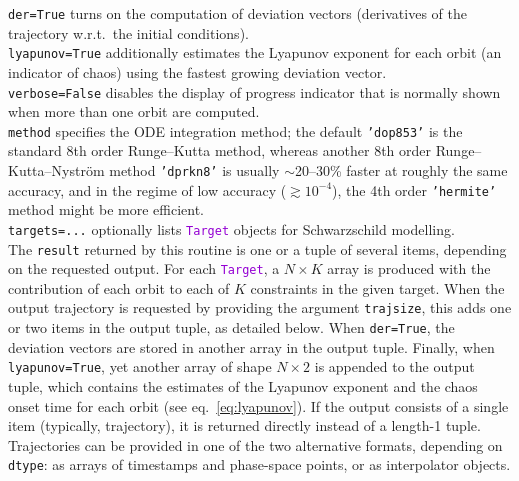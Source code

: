 \documentclass[12pt]{article}
\newcommand{\ttt}[1]{\textcolor{darkviolet}{\texttt{#1}}}
\newcommand{\ppp}[1]{\textcolor{darkolive} {\texttt{#1}}}
\begin{document}
\ppp{der}\texttt{=True} turns on the computation of deviation vectors (derivatives of the trajectory w.r.t.\ the initial conditions).\\
\ppp{lyapunov}\texttt{=True} additionally estimates the Lyapunov exponent for each orbit (an indicator of chaos) using the fastest growing deviation vector.\\
\ppp{verbose}\texttt{=False} disables the display of progress indicator that is normally shown when more than one orbit are computed.\\
\ppp{method} specifies the ODE integration method; the default \texttt{'dop853'} is the standard 8th order Runge--Kutta method, whereas another 8th order Runge--Kutta--Nystr\"om method \texttt{'dprkn8'} is usually $\sim$20--30\% faster at roughly the same accuracy, and in the regime of low accuracy ($\gtrsim 10^{-4}$), the 4th order \texttt{'hermite'} method might be more efficient.\\
\ppp{targets=...} optionally lists \ttt{Target} objects for Schwarzschild modelling. \\[2mm]
The \texttt{result} returned by this routine is one or a tuple of several items, depending on the requested output. For each \ttt{Target}, a $N\times K$ array is produced with the contribution of each orbit to each of $K$ constraints in the given target. When the output trajectory is requested by providing the argument \ppp{trajsize}, this adds one or two items in the output tuple, as detailed below. When \ppp{der}\texttt{=True}, the deviation vectors are stored in another array in the output tuple. Finally, when \ppp{lyapunov}\texttt{=True}, yet another array of shape $N\times 2$ is appended to the output tuple, which contains the estimates of the Lyapunov exponent and the chaos onset time for each orbit (see eq.~\ref{eq:lyapunov}). If the output consists of a single item (typically, trajectory), it is returned directly instead of a length-1 tuple.\\[1mm]
Trajectories can be provided in one of the two alternative formats, depending on \ppp{dtype}: as arrays of timestamps and phase-space points, or as interpolator objects.\\
\end{document}
